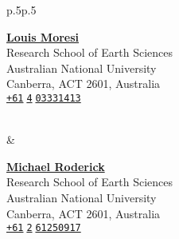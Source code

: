 \documentclass[10pt, letter]{article}
\begin{document}
\begin{tabular}{p{}p{}}
 \begin{minipage}[c]{.55\textwidth}
 \raggedright \href{https://scholar.google.com/citations?hl=en&user=f8WWAbgAAAAJ}{\color{black}\textbf{Louis Moresi}}\\
 Research School of Earth Sciences\\
 Australian National University\\
 Canberra, ACT 2601, Australia\\
 {}\hspace{.188cm}\texttt{\href{skype:+61403331413?sms}{+61$\;$4$\;$03331413}}\\
 \hspace{-.1em}\\
 \hspace{.1em}{w}\end{minipage}%
 &
 \begin{minipage}[c]{.48\textwidth}
 \raggedright \href{https://scholar.google.com/citations?hl=en&user=skZNvj8AAAAJ}{\color{black}\textbf{Michael Roderick}}\\
 Research School of Earth Sciences\\
 Australian National University\\
 Canberra, ACT 2601, Australia\\
 {}\hspace{.188cm}\texttt{\href{skype:+61261250917?sms}{+61$\;$2$\;$61250917}}\\
 \hspace{-.1em}\\
 \hspace{.1em}{w}\end{minipage}\\
\end{tabular}
\end{document}
